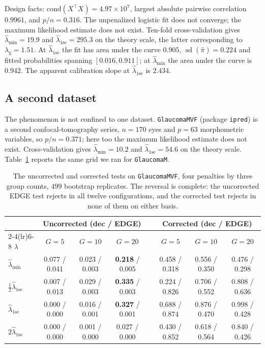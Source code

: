 \documentclass[11pt,a4paper]{article}
\DeclareMathOperator{\sd}{sd}
\theoremstyle{plain}
\theoremstyle{remark}
\begin{document}
Design facts: $\mathrm{cond}(X^{\top}X) = 4.97\times10^{7}$, largest absolute pairwise
correlation $0.9961$, and $p/n = 0.316$. The unpenalized logistic fit does not converge;
the maximum likelihood estimate does not exist. Ten-fold cross-validation gives
$\hat\lambda_{\min} = 19.9$ and $\hat\lambda_{1\mathrm{se}} = 295.3$ on the theory scale,
the latter corresponding to $\lambda_{\mathrm{g}} = 1.51$. At
$\hat\lambda_{1\mathrm{se}}$ the fit has area under the curve $0.905$,
$\sd(\hat\pi) = 0.224$ and fitted probabilities spanning $[0.016, 0.911]$; at
$\hat\lambda_{\min}$ the area under the curve is $0.942$. The apparent calibration slope
at $\hat\lambda_{1\mathrm{se}}$ is $2.434$.

\subsection{A second dataset}\label{sec:mvf}

The phenomenon is not confined to one dataset. \texttt{GlaucomaMVF} (package
\texttt{ipred}) is a second confocal-tomography series, $n = 170$ eyes and $p = 63$
morphometric variables, so $p/n = 0.371$; here too the maximum likelihood estimate does
not exist. Cross-validation gives $\hat\lambda_{\min} = 10.2$ and
$\hat\lambda_{1\mathrm{se}} = 54.6$ on the theory scale.
Table~\ref{tab:mvf} reports the same grid we ran for \texttt{GlaucomaM}.

\begin{table}[htbp]
\centering
\caption{The uncorrected and corrected tests on \texttt{GlaucomaMVF}, four penalties by
three group counts, $499$ bootstrap replicates. The reversal is complete: the uncorrected
EDGE test rejects in all twelve configurations, and the corrected test rejects in none of
them on either basis.}
\label{tab:mvf}
\small
\setlength{\tabcolsep}{4pt}
\begin{tabular}{lccccccc}
\toprule
& \multicolumn{3}{c}{Uncorrected (dec / EDGE)} & & \multicolumn{3}{c}{Corrected (dec / EDGE)} \\
\cmidrule(lr){2-4}\cmidrule(lr){6-8}
$\lambda$ & $G=5$ & $G=10$ & $G=20$ & & $G=5$ & $G=10$ & $G=20$ \\
\midrule
$\hat\lambda_{\min}$ & 0.077 / 0.041 & 0.023 / 0.003 & \textbf{0.218} / 0.005 & & 0.458 / 0.318 & 0.556 / 0.350 & 0.476 / 0.298 \\
$\tfrac12\hat\lambda_{1\mathrm{se}}$ & 0.007 / 0.013 & 0.029 / 0.003 & \textbf{0.335} / 0.003 & & 0.224 / 0.826 & 0.706 / 0.552 & 0.808 / 0.636 \\
$\hat\lambda_{1\mathrm{se}}$ & 0.000 / 0.000 & 0.016 / 0.001 & \textbf{0.327} / 0.001 & & 0.688 / 0.874 & 0.876 / 0.470 & 0.998 / 0.428 \\
$2\hat\lambda_{1\mathrm{se}}$ & 0.000 / 0.000 & 0.001 / 0.000 & 0.027 / 0.000 & & 0.430 / 0.852 & 0.618 / 0.564 & 0.840 / 0.426 \\
\bottomrule
\end{tabular}
\end{table}
\end{document}
